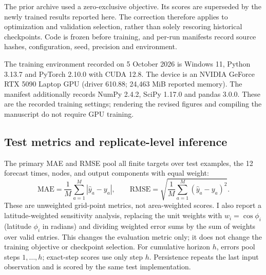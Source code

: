 \documentclass[fleqn,10pt]{wlscirep}
\begin{document}
The prior archive used a zero-exclusive objective. Its scores are superseded
by the newly trained results reported here. The correction therefore applies
to optimization and validation selection, rather than solely rescoring
historical checkpoints. Code is frozen before training, and per-run manifests
record source hashes, configuration, seed, precision and environment.

The training environment recorded on 5 October 2026 is Windows 11,
Python 3.13.7 and PyTorch 2.10.0 with CUDA 12.8. The device is an NVIDIA
GeForce RTX 5090 Laptop GPU (driver 610.88; 24,463 MiB reported memory).
The manifest additionally records NumPy 2.4.2, SciPy 1.17.0 and pandas 3.0.0.
These are the recorded training settings; rendering the revised figures
and compiling the manuscript do not require GPU training.


\subsection{Test metrics and replicate-level inference}\label{sec:metrics}
The primary MAE and RMSE pool all finite targets over test examples, the
12 forecast times, nodes, and output components with equal weight:
\begin{equation}
\mathrm{MAE}=\frac{1}{M}\sum_{a=1}^M|\widehat y_a-y_a|,
\qquad
\mathrm{RMSE}=\sqrt{\frac{1}{M}\sum_{a=1}^M(\widehat y_a-y_a)^2}.
\label{eq:metrics}
\end{equation}
These are unweighted grid-point metrics, not area-weighted scores. I also
report a latitude-weighted sensitivity analysis, replacing the unit weights
with $w_i=\cos\phi_i$ (latitude $\phi_i$ in radians) and dividing weighted error sums by the sum of weights
over valid entries. This changes the evaluation metric only; it does not
change the training objective or checkpoint selection. For cumulative horizon $h$, errors pool steps
$1,\ldots,h$; exact-step scores use only step $h$. Persistence repeats the
last input observation and is scored by the same test implementation.
\end{document}
